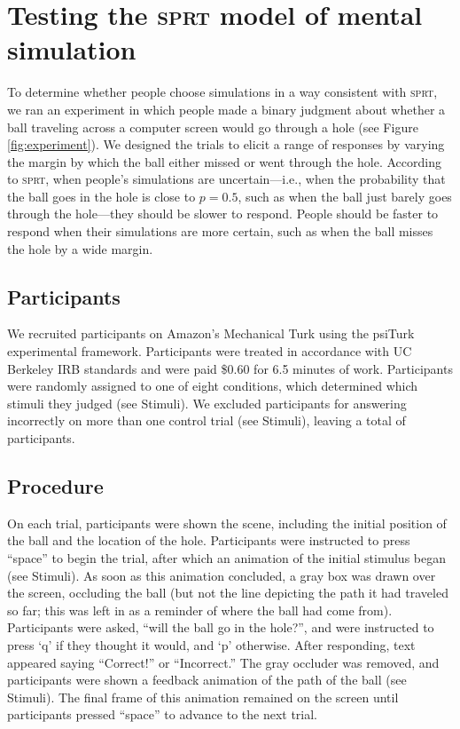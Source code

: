 \documentclass[10pt,letterpaper]{article}
\begin{document}
\section{Testing the \textsc{sprt} model of mental simulation}

To determine whether people choose simulations in a way consistent with \textsc{sprt}, we ran an experiment in which people made a binary judgment about whether a ball traveling across a computer screen would go through a hole (see Figure \ref{fig:experiment}).
We designed the trials to elicit a range of responses by varying the margin by which the ball either missed or went through the hole.
According to \textsc{sprt}, when people's simulations are uncertain---i.e., when the probability that the ball goes in the hole is close to $p=0.5$, such as when the ball just barely goes through the hole---they should be slower to respond.
People should be faster to respond when their simulations are more certain, such as when the ball misses the hole by a wide margin.

\subsection{Participants}

We recruited \HoleNumComplete{} participants on Amazon's Mechanical Turk using the psiTurk \cite{McDonnell12} experimental framework.
Participants were treated in accordance with UC Berkeley IRB standards and were paid \$0.60 for 6.5 minutes of work.
Participants were randomly assigned to one of eight conditions, which determined which stimuli they judged (see Stimuli). 
We excluded \HoleNumFailed{} participants for answering incorrectly on more than one control trial (see Stimuli), leaving a total of \HoleNumOk{} participants.

\subsection{Procedure}

On each trial, participants were shown the scene, including the initial position of the ball and the location of the hole. 
Participants were instructed to press ``space'' to begin the trial, after which an animation of the initial stimulus began (see Stimuli). 
As soon as this animation concluded, a gray box was drawn over the screen, occluding the ball (but not the line depicting the path it had traveled so far; this was left in as a reminder of where the ball had come from). 
Participants were asked, ``will the ball go in the hole?'', and were instructed to press `q' if they thought it would, and `p' otherwise. 
After responding, text appeared saying ``Correct!'' or ``Incorrect.''
The gray occluder was removed, and participants were shown a feedback animation of the path of the ball (see Stimuli).
The final frame of this animation remained on the screen until participants pressed ``space'' to advance to the next trial.
\end{document}
